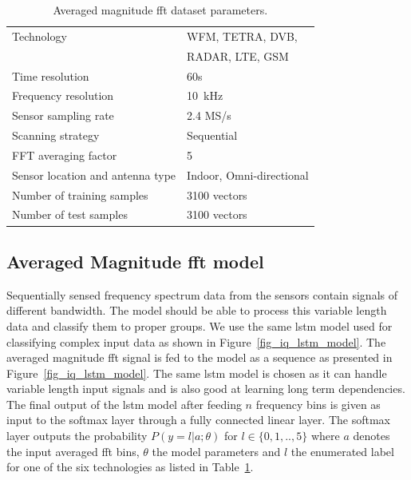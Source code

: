 \begin{table}[!t]
\begin{center}
\begin{tabular}{|l|l|}
	\hline
    Technology     & WFM, TETRA, DVB,\\  
                   & RADAR, LTE, GSM \\
    								 
    \hline
    Time resolution & 60s\\
    \hline
    Frequency resolution & 10~kHz\\
  	\hline
    Sensor sampling rate &  2.4 MS/s \\
  	\hline
    Scanning strategy &  Sequential \\
  	\hline
    FFT averaging factor  & 5 \\
    \hline 
    Sensor location and antenna type & Indoor, Omni-directional\\    
    \hline
  	Number of training samples &   3100 vectors\\
  	\hline
  	Number of test samples &  3100 vectors\\
    \hline
\end{tabular}
\end{center}
\caption{Averaged magnitude \ac{fft} dataset parameters.}
\label{table_elec_dataset}
\end{table}

\subsection{Averaged Magnitude \ac{fft} model}
Sequentially sensed frequency spectrum data from the sensors contain signals of different bandwidth. The model should be able to process this variable length data 
and classify them to proper groups. We use the same \ac{lstm} model used for classifying complex input data as shown in Figure~\ref{fig_iq_lstm_model}. 
The averaged magnitude \ac{fft} signal is fed to the model as a sequence as presented in Figure~\ref{fig_iq_lstm_model}. The same \ac{lstm} model is chosen as it can handle variable length input signals and is also good at learning long term dependencies. The final output of the \ac{lstm} model after feeding $n$ frequency bins 
is given as input to the softmax layer through a fully connected linear layer. The softmax layer outputs the probability $P(y=l|a;\theta)$ for $l \in \{0,1,..,5\}$ where $a$ denotes the input averaged \ac{fft} bins, $\theta$ the model parameters and $l$ the enumerated label for one of the six technologies as listed in Table~\ref{table_elec_dataset}.

